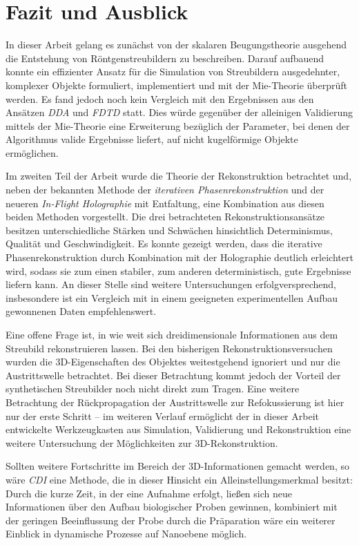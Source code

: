\chapter{Fazit und Ausblick}
In dieser Arbeit gelang es zunächst von der skalaren Beugungstheorie ausgehend die Entstehung von Röntgenstreubildern zu beschreiben. Darauf aufbauend konnte ein effizienter Ansatz für die Simulation von Streubildern ausgedehnter, komplexer Objekte formuliert, implementiert und mit der Mie-Theorie überprüft werden. Es fand jedoch noch kein Vergleich mit den Ergebnissen aus den Ansätzen \textit{DDA} und \textit{FDTD} statt. Dies würde gegenüber der alleinigen Validierung mittels der Mie-Theorie eine Erweiterung bezüglich der Parameter, bei denen der Algorithmus valide Ergebnisse liefert, auf nicht kugelförmige Objekte ermöglichen. 

Im zweiten Teil der Arbeit wurde die Theorie der Rekonstruktion betrachtet und, neben der bekannten Methode der \textit{iterativen Phasenrekonstruktion} und der neueren \textit{In-Flight Holographie} mit Entfaltung, eine Kombination aus diesen beiden Methoden vorgestellt. Die drei betrachteten Rekonstruktionsansätze besitzen unterschiedliche Stärken und Schwächen hinsichtlich Determinismus, Qualität und Geschwindigkeit. Es konnte gezeigt werden, dass die iterative Phasenrekonstruktion durch Kombination mit der Holographie deutlich erleichtert wird, sodass sie zum einen stabiler, zum anderen deterministisch, gute Ergebnisse liefern kann. An dieser Stelle sind weitere Untersuchungen erfolgversprechend, insbesondere ist ein Vergleich mit in einem geeigneten experimentellen Aufbau gewonnenen Daten empfehlenswert.

Eine offene Frage ist, in wie weit sich dreidimensionale Informationen aus dem Streubild rekonstruieren lassen. Bei den bisherigen Rekonstruktionsversuchen wurden die 3D-Eigenschaften des Objektes weitestgehend ignoriert und nur die Austrittswelle betrachtet. Bei dieser Betrachtung kommt jedoch der Vorteil der synthetischen Streubilder noch nicht direkt zum Tragen. Eine weitere Betrachtung der Rückpropagation der Austrittswelle zur Refokussierung ist hier nur der erste Schritt -- im weiteren Verlauf ermöglicht der in dieser Arbeit entwickelte Werkzeugkasten aus Simulation, Validierung und Rekonstruktion eine weitere Untersuchung der Möglichkeiten zur 3D-Rekonstruktion. 

Sollten weitere Fortschritte im Bereich der 3D-Informationen gemacht werden, so wäre \textit{CDI} eine Methode, die in dieser Hinsicht ein Alleinstellungsmerkmal besitzt: Durch die kurze Zeit, in der eine Aufnahme erfolgt, ließen sich neue Informationen über den Aufbau biologischer Proben gewinnen, kombiniert mit der geringen Beeinflussung der Probe durch die Präparation wäre ein weiterer Einblick in dynamische Prozesse auf Nanoebene möglich. 